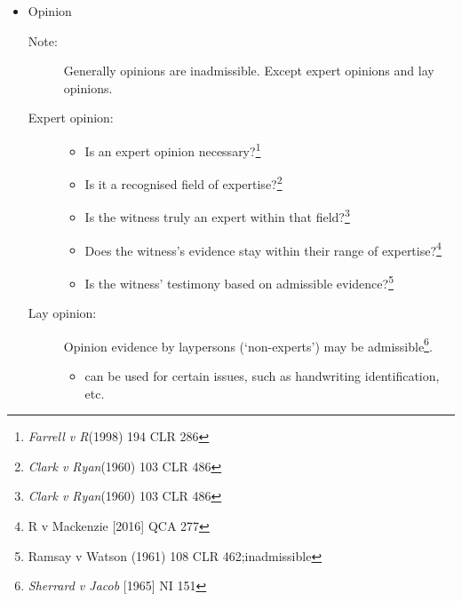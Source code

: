 \begin{itemize}
    \item Opinion
        \begin{description}
            \item[Note:] Generally opinions are inadmissible. Except expert opinions and lay opinions.
            \item[Expert opinion:]
                \begin{itemize}
                    \item Is an expert opinion necessary?\footnote{\textit{Farrell v R}(1998) 194 CLR 286}
                    \item Is it a recognised field of expertise?\footnote{\textit{Clark v Ryan}(1960) 103 CLR 486}
                    \item Is the witness truly an expert within that field?\footnote{\textit{Clark v Ryan}(1960) 103 CLR 486}
                    \item Does the witness’s evidence stay within their range of expertise?\footnote{R v Mackenzie [2016] QCA 277}
                    \item Is the witness’ testimony based on admissible evidence?\footnote{Ramsay v Watson (1961) 108 CLR 462;inadmissible}
                \end{itemize}
                
            \item[Lay opinion:]Opinion evidence by laypersons (‘non-experts’) may be admissible\footnote{\textit{Sherrard v Jacob }[1965] NI 151}.
                \begin{itemize}
                    \item can be used for certain issues, such as handwriting identification, etc. 
                \end{itemize}
        \end{description}
\end{itemize}
